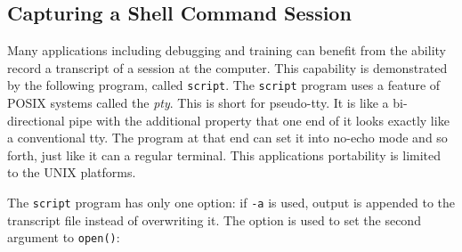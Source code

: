 
\subsection{Capturing a Shell Command Session}

Many applications including debugging and training can benefit from the
ability record a transcript of a session at the computer. This
capability is demonstrated by the following program, called
\texttt{script}. The \texttt{script} program uses a feature of POSIX
systems called the \textit{pty}. This is short for
pseudo-tty. It is like a bi-directional pipe with the
additional property that one end of it looks exactly like a
conventional tty. The program at that end can set it into
{\textquotedbl}no-echo{\textquotedbl} mode and so forth, just like it
can a regular terminal. This application{\textquotesingle}s portability
is limited to the UNIX platforms.

The \texttt{script} program has only one option: if \texttt{{}-a} is
used, output is appended to the transcript file instead of overwriting
it. The option is used to set the second argument to \texttt{open()}: 


